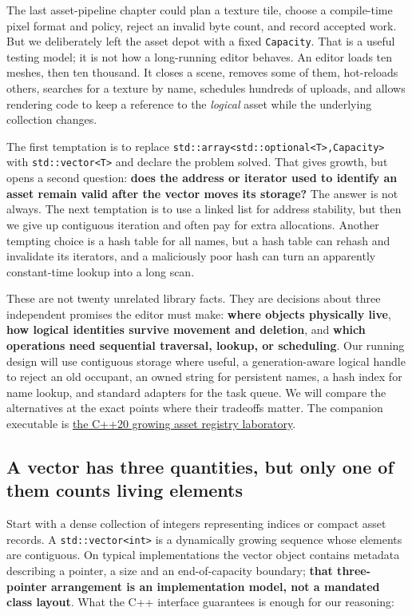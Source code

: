 The last asset-pipeline chapter could plan a texture tile, choose a compile-time pixel format and policy, reject an invalid byte count, and record accepted work. But we deliberately left the asset depot with a fixed \texttt{Capacity}. That is a useful testing model; it is not how a long-running editor behaves. An editor loads ten meshes, then ten thousand. It closes a scene, removes some of them, hot-reloads others, searches for a texture by name, schedules hundreds of uploads, and allows rendering code to keep a reference to the \emph{logical} asset while the underlying collection changes.

The first temptation is to replace \texttt{std::array\textless{}std::optional\textless{}T\textgreater{},Capacity\textgreater{}} with \texttt{std::vector\textless{}T\textgreater{}} and declare the problem solved. That gives growth, but opens a second question: \textbf{does the address or iterator used to identify an asset remain valid after the vector moves its storage?} The answer is not always. The next temptation is to use a linked list for address stability, but then we give up contiguous iteration and often pay for extra allocations. Another tempting choice is a hash table for all names, but a hash table can rehash and invalidate its iterators, and a maliciously poor hash can turn an apparently constant-time lookup into a long scan.

These are not twenty unrelated library facts. They are decisions about three independent promises the editor must make: \textbf{where objects physically live}, \textbf{how logical identities survive movement and deletion}, and \textbf{which operations need sequential traversal, lookup, or scheduling}. Our running design will use contiguous storage where useful, a generation-aware logical handle to reject an old occupant, an owned string for persistent names, a hash index for name lookup, and standard adapters for the task queue. We will compare the alternatives at the exact points where their tradeoffs matter. The companion executable is \hyperref[source-file-e829cf731b17419e282775cf]{the C++20 growing asset registry laboratory}.

\subsection{A vector has three quantities, but only one of them counts living elements}\label{05-engine-i-ch005-a-vector-has-three-quantities-but-only-one-of-them-counts-living-elements}

Start with a dense collection of integers representing indices or compact asset records. A \texttt{std::vector\textless{}int\textgreater{}} is a dynamically growing sequence whose elements are contiguous. On typical implementations the vector object contains metadata describing a pointer, a size and an end-of-capacity boundary; \textbf{that three-pointer arrangement is an implementation model, not a mandated class layout}. What the C++ interface guarantees is enough for our reasoning:

